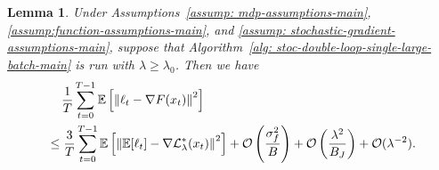 \documentclass{article}
\theoremstyle{plain}
\newtheorem{lemma}{Lemma}
\theoremstyle{definition}
\theoremstyle{remark}
\def\E{\mathbb E}
\def\cL{\mathcal L}
\def\cO{\mathcal O}
\begin{document}
\begin{lemma}
    \label{lemma: bound-of-difference-of-stochastic-outer-large-batch}
Under Assumptions~\ref{assump: mdp-assumptions-main},
\ref{assump:function-assumptions-main}, and
\ref{assump: stochastic-gradient-assumptions-main}, suppose that
Algorithm~\ref{alg: stoc-double-loop-single-large-batch-main} is run with
$\lambda \geq \lambda_0$. Then we have
    \begin{align}
        &  \quad \, \frac{1}{T}\sum_{t=0}^{T-1} \E \left[ \left\|\ell_{t} - \nabla F(x_{t})  \right\|^2 \right] \notag \\
        & \leq \frac{3}{T}\sum_{t=0}^{T-1} \E \left[ \left\| \E [\ell_t] - \nabla \cL_\lambda^*(x_t)\right\|^2 \right] + \cO\left(\frac{\sigma_f^2}{B}\right) + \cO\left(\frac{\lambda^2}{B_J}\right) + \cO(\lambda^{-2})  \notag.
    \end{align}
\end{lemma}
\end{document}
